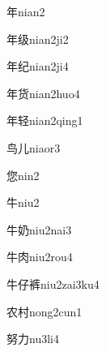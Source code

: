 \begin{verbete}[6]{年}{nian2}
\end{verbete}

\begin{verbete}[6;6]{年级}{nian2ji2}
\end{verbete}

\begin{verbete}[6;6]{年纪}{nian2ji4}
\end{verbete}

\begin{verbete}[6;8]{年货}{nian2huo4}
\end{verbete}

\begin{verbete}[6;9]{年轻}{nian2qing1}
\end{verbete}

\begin{verbete}[5;2]{鸟儿}{niaor3}
\end{verbete}

\begin{verbete}[11]{您}{nin2}
\end{verbete}

\begin{verbete}[4]{牛}{niu2}
\end{verbete}

\begin{verbete}[4;5]{牛奶}{niu2nai3}
\end{verbete}

\begin{verbete}[4;6]{牛肉}{niu2rou4}
\end{verbete}

\begin{verbete}[4;5;12]{牛仔裤}{niu2zai3ku4}
\end{verbete}

\begin{verbete}[6;7]{农村}{nong2cun1}
\end{verbete}

\begin{verbete}[7;2]{努力}{nu3li4}
\end{verbete}

